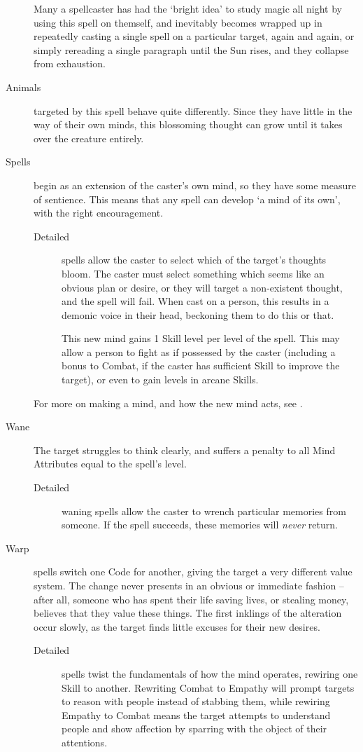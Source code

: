 \begin{multicols}{2}
\begin{description}
    Many a spellcaster has had the `bright idea' to study magic all night by using this spell on themself, and inevitably becomes wrapped up in repeatedly casting a single spell on a particular target, again and again, or simply rereading a single paragraph until the Sun rises, and they collapse from exhaustion.
  \item[Animals]
    targeted by this spell behave quite differently.
    Since they have little in the way of their own minds, this blossoming thought can grow until it takes over the creature entirely.
  \item[Spells]
    begin as an extension of the caster's own mind, so they have some measure of sentience.
    This means that any spell can develop `a mind of its own', with the right encouragement.
    \begin{description}
      \item[Detailed]
        spells allow the caster to select which of the target's thoughts bloom.
        The caster must select something which seems like an obvious plan or desire, or they will target a non-existent thought, and the spell will fail.
        When cast on a person, this results in a demonic voice in their head, beckoning them to do this or that.

        This new mind gains 1 Skill level per level of the spell.
        This may allow a person to fight as if possessed by the caster (including a bonus to Combat, if the caster has sufficient Skill to improve the target), or even to gain levels in arcane Skills.
    \end{description}
    For more on making a mind, and how the new mind acts, see .

  \item[Wane]
    The target struggles to think clearly, and suffers a penalty to all Mind Attributes equal to the spell's level.
    \begin{description}
      \item[Detailed]
        waning spells allow the caster to wrench particular memories from someone.
        If the spell succeeds, these memories will \emph{never} return.
    \end{description}
  \item[Warp]
    spells switch one Code for another, giving the target a very different value system.
    The change never presents in an obvious or immediate fashion -- after all, someone who has spent their life saving lives, or stealing money, believes that they value these things.
    The first inklings of the alteration occur slowly, as the target finds little excuses for their new desires.
    \begin{description}
      \item[Detailed]
        spells twist the fundamentals of how the mind operates, rewiring one Skill to another.
        Rewriting Combat to Empathy will prompt targets to reason with people instead of stabbing them, while rewiring Empathy to Combat means the target attempts to understand people and show affection by sparring with the object of their attentions.


\end{description}
\end{description}
\end{multicols}
